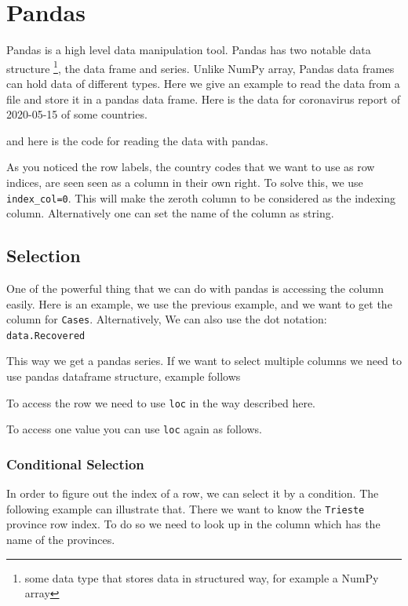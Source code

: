 \documentclass[10pt,a4paper]{article}
\newcommand{\te}{\texttt}
\begin{document}


\section{Pandas} \label{pandas}
Pandas is a high level data manipulation tool. Pandas has two notable data structure \footnote{some data type that stores data in structured way, for example a NumPy array}, the data frame and series. Unlike NumPy array, Pandas data frames can hold data of different types. Here  we give an example to read the data from a file and store it in a pandas data frame. Here is the data for coronavirus report of 2020-05-15 of some countries. 

and here is the code for reading the data with pandas.

As you noticed the row labels, the country codes that we want to use as row indices, are seen  seen as a column in their own right. To solve this, we use \te{index\_col=0}. This will make the zeroth column to be considered as the indexing column. Alternatively one can set the name of the column as string. 


\subsection{Selection}
One of the powerful thing that we can do with pandas is accessing the column easily. Here is an example, we use the previous example, and we want to get the column for \te{Cases}. Alternatively, We can also use the dot notation: \te{data.Recovered}



This way we get a pandas series. If we want to select multiple columns we need to use pandas dataframe structure, example follows


To access the row we need to use \te{loc} in the way described here.

To access one value you can use \te{loc} again as follows. 

\subsubsection{Conditional Selection}
In order to figure out the index of a row, we can select it by a condition. The following example can illustrate that. There we want to know the \te{Trieste} province row index. To do so we need to look up in the column which has the name of the provinces.

\end{document}
